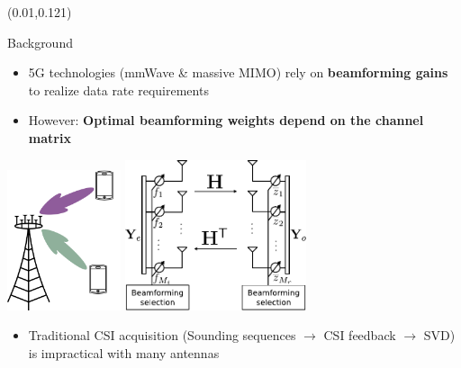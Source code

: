 \documentclass[pdf]{beamer}
\begin{document}
\begin{frame}[t]
\begin{textblock}{0.98}(0.01,0.121)
  \begin{tcbraster}[%
    raster columns = 2,
    raster column skip = 0.01\paperwidth,
    raster row skip = 0.01\paperwidth,
    raster equal height=rows
    ]%
    \begin{mybox}[%
      lefthand ratio=0.5,
      sidebyside align=top seam,
      raster multicolumn=2
      ]{Background}
      \addtolength{\leftmargini}{\labelsep}
      \begin{itemize}
      \item 5G technologies (mmWave \& massive MIMO) rely on \textbf{beamforming gains} to realize data rate requirements
      \item However: \textbf{Optimal beamforming weights depend on the channel matrix}
      \end{itemize}
      \begin{center}
        \includegraphics[width=0.25\textwidth]{./figures/beamforming.pdf}
        \hspace*{1.3in}
         \includegraphics[width=0.4\textwidth]{./figures/sysmodel/system_model.pdf}
    \end{center}
    \tcblower
      \addtolength{\leftmargini}{\labelsep}
      \begin{itemize}
      \item Traditional CSI acquisition (Sounding sequences $\rightarrow$ CSI feedback $\rightarrow$ SVD) is impractical with many antennas

\end{itemize}
\end{mybox}
\end{tcbraster}
\end{textblock}
\end{frame}
\end{document}
